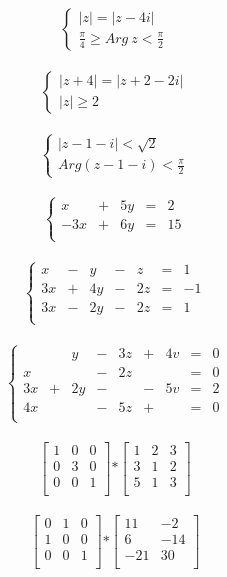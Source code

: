 \documentclass[12pt, letterpaper, titlepage]{article}
\begin{document}
$$ 
\begin{cases}
|z|=|z - 4i| \\
\frac{\pi}{4}\geq Arg \ z < \frac{\pi}{2}\end{cases}
$$
\\
$$ 
\begin{cases}
|z+4|=|z + 2 - 2i| \\
|z|\geq 2\end{cases}
$$
\\
$$ 
\begin{cases}
|z - 1 - i|<\sqrt{2} \\
Arg(z - 1 - i)<\frac{\pi}{2}\end{cases}
$$
\\
$$
\left\{
\begin{array}{rrrrr}
  x  & + &  5y & = & 2  \\
 -3x & + & 6y & = & 15  \\
\end{array}
\right.
$$
\\
$$
\left\{
\begin{array}{rrrrrrr}
 x & - & y  & - &  z & = &   1  \\
3x & + & 4y & - & 2z & = & -1   \\
3x & - & 2y & - & 2z & = &  1   \\
\end{array}
\right.
$$
\\
$$
\left\{
\begin{array}{rrrrrrrrr}
   &   & y  & - & 3z & + & 4v & = &   0  \\
 x  &   &   & - & 2z &  &  & = &   0  \\
 3x  & +  & 2y  & - &  & - & 5v & = &   2  \\
 4x  &   &   & - & 5z & + &  & = &   0  \\
\end{array}
\right.
$$
\\
$$ 
\left[ \begin{array}{ccc}
1 & 0 & 0 \\
0 & 3 & 0 \\
0 & 0 & 1 \\
\end{array} \right]
\mathbf{*}
\left[ \begin{array}{ccc}
1 & 2 & 3 \\
3 & 1 & 2 \\
5 & 1 & 3 \\
\end{array} \right] 
$$
\\
$$ 
\left[ \begin{array}{ccc}
0 & 1 & 0 \\
1 & 0 & 0 \\
0 & 0 & 1 \\
\end{array} \right]
\mathbf{*}
\left[ \begin{array}{cc}
11 & -2  \\
6 & -14  \\
-21 & 30 \\
\end{array} \right] 
$$
\end{document}
